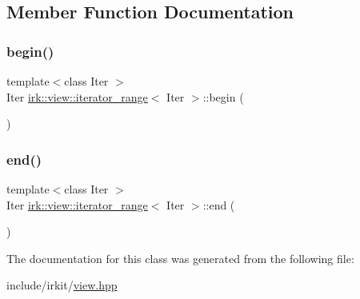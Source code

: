 \subsection{Member Function Documentation}
\mbox{\label{classirk_1_1view_1_1iterator__range_acdb98ba5c79f29b08971e5ebae0b55b9}} 
\subsubsection{\texorpdfstring{begin()}{begin()}}
{\footnotesize\ttfamily template$<$class Iter $>$ \\
Iter \mbox{\hyperlink{classirk_1_1view_1_1iterator__range}{irk\+::view\+::iterator\+\_\+range}}$<$ Iter $>$\+::begin (\begin{DoxyParamCaption}{ }\end{DoxyParamCaption})\hspace{0.3cm}{\ttfamily [inline]}}

\mbox{\label{classirk_1_1view_1_1iterator__range_ae16f30d12bddb0347e27e746e9c844ca}} 
\subsubsection{\texorpdfstring{end()}{end()}}
{\footnotesize\ttfamily template$<$class Iter $>$ \\
Iter \mbox{\hyperlink{classirk_1_1view_1_1iterator__range}{irk\+::view\+::iterator\+\_\+range}}$<$ Iter $>$\+::end (\begin{DoxyParamCaption}{ }\end{DoxyParamCaption})\hspace{0.3cm}{\ttfamily [inline]}}



The documentation for this class was generated from the following file\+:\begin{DoxyCompactItemize}
\item 
include/irkit/\mbox{\hyperlink{view_8hpp}{view.\+hpp}}\end{DoxyCompactItemize}
